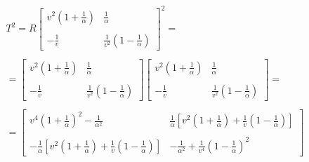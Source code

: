 \begin{equation}
  \label{5.12}
  \begin{array}{c}
    T^2 = R\left[
      \begin{array}{cc}
        v^2(1+\frac{1}{\alpha}) & \frac{1}{\alpha}
        \\

        \\
        -\frac{1}{v} & \frac{1}{v^2}(1-\frac{1}{\alpha})
      \end{array}
    \right]^2=

    \\

    \\

    =\left[
      \begin{array}{cc}
        v^2(1+\frac{1}{\alpha}) & \frac{1}{\alpha}
        \\

        \\
        -\frac{1}{v} & \frac{1}{v^2}(1-\frac{1}{\alpha})
      \end{array}
    \right]
    \left[
      \begin{array}{cc}
        v^2(1+\frac{1}{\alpha}) & \frac{1}{\alpha}
        \\

        \\
        -\frac{1}{v} & \frac{1}{v^2}(1-\frac{1}{\alpha})
      \end{array}
    \right] =

    \\

    \\

    =
    \left[
      \begin{array}{cc}
        v^4(1+\frac{1}{\alpha})^2-\frac{1}{\alpha^2} & \frac{1}{\alpha}[v^2(1+\frac{1}{\alpha})+\frac{1}{v}(1-\frac{1}{\alpha})]
        \\

        \\
        -\frac{1}{\alpha}[v^2(1+\frac{1}{\alpha})+\frac{1}{v}(1-\frac{1}{\alpha})] & -\frac{1}{\alpha^2} + \frac{1}{v^4}(1-\frac{1}{\alpha})^2
      \end{array}
    \right]
  \end{array}
\end{equation}









